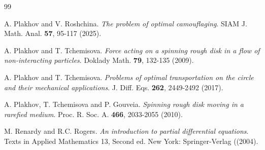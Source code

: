 \documentclass[a4paper,12pt]{article}
\theoremstyle{remark}
\theoremstyle{definition}
\begin{document}
\begin{thebibliography}{99}




A. Plakhov and V. Roshchina. {\it The problem of optimal camouflaging}. SIAM J. Math. Anal. {\bf 57}, 95-117 (2025). %

A. Plakhov and T. Tchemisova. {\it Force acting on a spinning rough disk in a flow of non-interacting particles}.
Doklady Math. {\bf 79}, 132-135 (2009).

A. Plakhov and T. Tchemisova. {\it Problems of optimal transportation on the circle and their mechanical applications}. J. Diff. Eqs. {\bf 262}, 2449-2492 (2017). %

A. Plakhov, T. Tchemisova and P. Gouveia. {\it Spinning rough disk moving in a rarefied medium}. Proc. R. Soc. A. {\bf 466}, 2033-2055 (2010).

 M. Renardy and R.C. Rogers. {\it An introduction to partial differential equations}. Texts in Applied Mathematics 13, Second ed. New York: Springer-Verlag ((2004).





\end{thebibliography}
\end{document}
